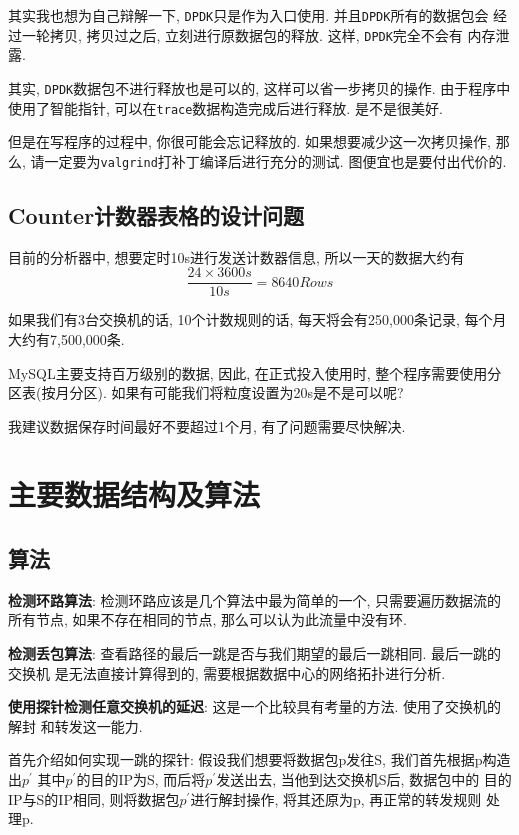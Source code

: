其实我也想为自己辩解一下, \texttt{DPDK}只是作为入口使用.
并且\texttt{DPDK}所有的数据包会 经过一轮拷贝, 拷贝过之后,
立刻进行原数据包的释放. 这样, \texttt{DPDK}完全不会有 内存泄露.

其实, \texttt{DPDK}数据包不进行释放也是可以的, 这样可以省一步拷贝的操作.
由于程序中 使用了智能指针, 可以在\texttt{trace}数据构造完成后进行释放.
是不是很美好.

但是在写程序的过程中, 你很可能会忘记释放的. 如果想要减少这一次拷贝操作, 那么,
请一定要为\texttt{valgrind}打补丁编译后进行充分的测试.
图便宜也是要付出代价的.


\section{Counter计数器表格的设计问题}

目前的分析器中, 想要定时10s进行发送计数器信息, 所以一天的数据大约有
$$\frac{24 \times 3600 s}{10s} = 8640 Rows $$

如果我们有3台交换机的话, 10个计数规则的话, 每天将会有250,000条记录,
每个月大约有7,500,000条.

MySQL主要支持百万级别的数据, 因此, 在正式投入使用时,
整个程序需要使用分区表(按月分区).
如果有可能我们将粒度设置为20s是不是可以呢?

我建议数据保存时间最好不要超过1个月, 有了问题需要尽快解决.

\chapter{主要数据结构及算法}
\label{chap:主要数据结构及算法}

\section{算法}
\label{chap:主要算法说明}

\textbf{检测环路算法}: 检测环路应该是几个算法中最为简单的一个,
只需要遍历数据流的所有节点, 如果不存在相同的节点,
那么可以认为此流量中没有环.

\textbf{检测丢包算法}: 查看路径的最后一跳是否与我们期望的最后一跳相同.
最后一跳的交换机 是无法直接计算得到的,
需要根据数据中心的网络拓扑进行分析.

\textbf{使用探针检测任意交换机的延迟}: 这是一个比较具有考量的方法.
使用了交换机的解封 和转发这一能力.

首先介绍如何实现一跳的探针: 假设我们想要将数据包p发往S,
我们首先根据p构造出\(p^{'}\) 其中\(p^{'}\)的目的IP为S,
而后将\(p^{'}\)发送出去, 当他到达交换机S后, 数据包中的
目的IP与S的IP相同, 则将数据包\(p^{'}\)进行解封操作, 将其还原为p,
再正常的转发规则 处理p.

